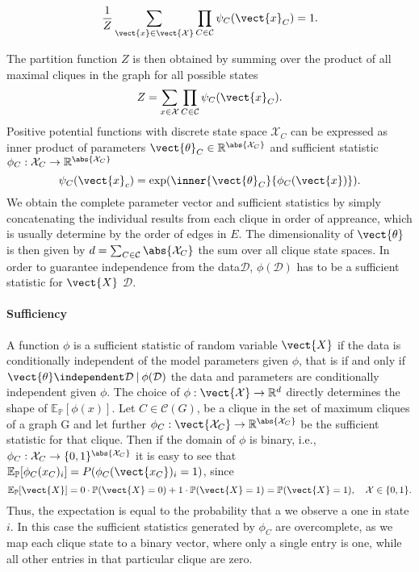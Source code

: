 \begin{equation}
    \frac{1}{Z} \sum_{\vect{x}\in \mathcal{\vect{X}}} \prod_{C \in \mathcal{C}} \psi_C(\vect{x}_C) = 1. 
\end{equation}

The partition function $Z$ is then obtained by summing over the product of all maximal cliques in the graph for all possible states
\begin{equation}
    Z = \sum_{x\in \mathcal{X}} \prod_{C \in \mathcal{C}} \psi_C(\vect{x}_C).
\end{equation}
Positive potential functions with discrete state space $\mathcal{X}_C$ can be expressed as inner product of parameters $\vect{\theta}_C \in \mathbb{R}^{\abs{\mathcal{X}_C}}$ and sufficient statistic $\phi_C: \mathcal{X}_C \rightarrow \mathbb{R}^{\abs{\mathcal{X}_C}}$ 
\begin{equation}
    \psi_C(\vect{x}_c) = \exp(\inner{\vect{\theta}_C}{\phi_C(\vect{x})}).
\end{equation}
We obtain the complete parameter vector and sufficient statistics by simply concatenating the individual results from each clique in order of appreance, which is usually determine by the order of edges in $E$.
The dimensionality of $\vect{\theta}$ is then given by $d = \sum_{C \in \mathcal{C}} \abs{\mathcal{X}_C}$ the sum over all clique state spaces.
In order to guarantee independence from the data$\mathcal{D}$,  $\phi(\mathcal{D})$ has to be a sufficient statistic for $\vect{X}$ \wrt $\mathcal{D}$.
\paragraph*{Sufficiency}
    A function $\phi$  is a sufficient statistic of random variable $\vect{X}$ if the data is conditionally independent of the model parameters given $\phi$, that is if and only if $\vect{\theta}\independent \mathcal{D} \:\lvert\: \phi(\mathcal{D})$ the data and parameters are conditionally independent given $\phi$.
    The choice of $\phi: \vect{\mathcal{X}} \rightarrow \mathbb{R}^d$ directly determines the shape of  $\mathbb{E}_{\mathbb{P}}[\phi(x)]$.
    Let $C \in \mathcal{C}(G)$, be a clique in the set of maximum cliques of a graph G and let further
    $\phi_C: \vect{\mathcal{X}_C} \rightarrow \mathbb{R}^{\abs{\mathcal{X}_C}}$ be the sufficient statistic for that clique.
    Then if the domain of $\phi$ is binary, i.e., $\phi_C : \mathcal{X}_C \rightarrow \{0,1\}^{\abs{\mathcal{X}_C}}$ it is easy to see that  $\mathbb{E}_{\mathbb{P}}[\phi_C(x_C)_i] = P(\phi_C(\vect{x_C})_i = 1)$, since
    \begin{equation}
        \mathbb{E}_{\mathbb{P}}[\vect{X}] = 0 \cdot \mathbb{P}(\vect{X} = 0) + 1 \cdot \mathbb{P}(\vect{X}= 1) = \mathbb{P}(\vect{X} = 1), \quad \mathcal{X} \in \{0,1\}.
    \end{equation}
    Thus, the expectation is equal to the probability that a we observe a one in state $i$.
    In this case the sufficient statistics generated by $\phi_C$ are overcomplete, as we map each clique state to a binary vector, where only a single entry is one, while all other entries in that particular clique are zero.  

